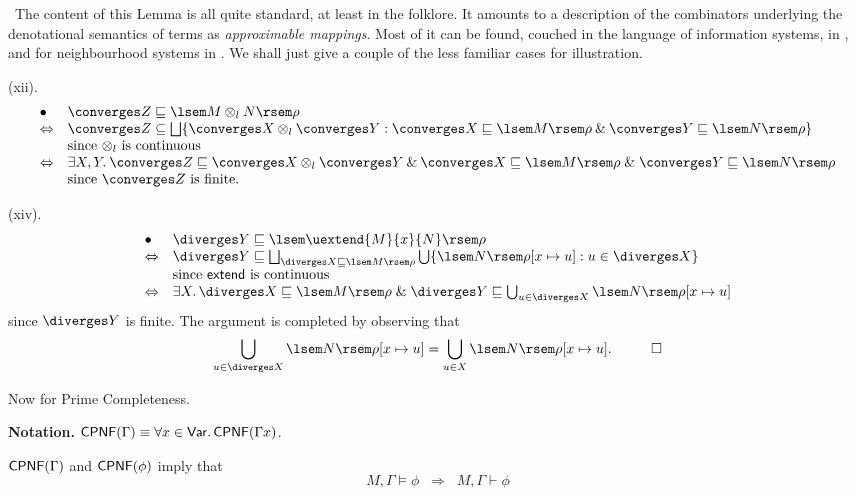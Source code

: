\proof\ The content of this Lemma is all quite standard, at least in the folklore.
It amounts to a description of the combinators underlying the denotational semantics of terms as {\em approximable mappings}.
Most of it can be found, couched in the language of information systems, in \cite{Sco82}, and for neighbourhood systems in \cite{Sco81}.
We shall just give a couple of the less familiar cases for illustration.

\noindent (xii).
\[ \begin{array}{ll}
\bullet & \converges Z \sqsubseteq \lsem M \otimes_{l} N \rsem \rho \\
\Leftrightarrow & \converges Z \subseteq \bigsqcup \{ \converges X \otimes_{l} \converges Y : \converges X \sqsubseteq \lsem M \rsem \rho \: \& \: \converges Y \sqsubseteq \lsem N \rsem \rho \} \\
& \mbox{since $\otimes_{l}$ is continuous} \\
\Leftrightarrow & \exists X, Y. \: \converges Z \sqsubseteq \converges X 
\otimes_{l} \converges Y \: \& \: \converges X \sqsubseteq \lsem M \rsem \rho 
\; \& \; \converges Y \sqsubseteq \lsem N \rsem \rho \\
& \mbox{since $\converges Z$ is finite.}  \\
\end{array} \]

\noindent (xiv).
\[ \begin{array}{ll}
\bullet & \diverges Y \sqsubseteq \lsem \uextend{M}{x}{N} \rsem \rho \\
\Leftrightarrow & \diverges Y \sqsubseteq \bigsqcup_{\diverges X \sqsubseteq \lsem M \rsem \rho} \bigcup \{ \lsem N \rsem \rho [x \mapsto u] : u \in \diverges X \} \\
& \mbox{since {\sf extend} is continuous} \\
\Leftrightarrow & \exists X. \, \diverges X \sqsubseteq \lsem M \rsem \rho \; \& \; \diverges Y \sqsubseteq \bigcup_{u \in \diverges X} \lsem N \rsem \rho [x \mapsto u] 
\end{array} \]
since $\diverges Y$ is finite.
The argument is completed by observing that
\[ \bigcup_{u \in \diverges X} \lsem N \rsem \rho [x \mapsto u] = \bigcup_{u \in X} \lsem N \rsem \rho [x \mapsto u] . \;\;\; \qed \]

Now for Prime Completeness.

{\bf Notation.} ${\sf CPNF}(\Gamma ) \equiv \forall x \in {\sf Var}. \, {\sf CPNF}(\Gamma x)$.

\begin{theorem}
\label{pricom}
${\sf CPNF}(\Gamma )$ and ${\sf CPNF}(\phi )$ imply that
\[ M, \Gamma \models \phi \;\; \Longrightarrow \;\; M, \Gamma \vdash \phi \]
\end{theorem}

